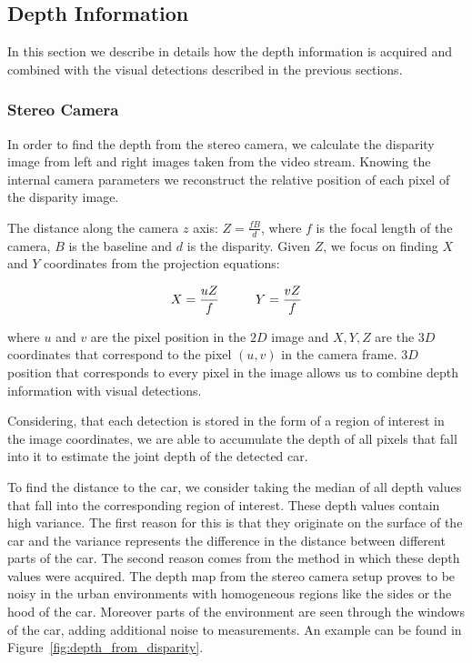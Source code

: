 \subsection{Depth Information}\label{sub:depth_information}

In this section we describe in details how the depth information is acquired
and combined with the visual detections described in the previous sections.

\subsubsection{Stereo Camera}\label{ssub:stereo_camera}

In order to find the depth from the stereo camera, we calculate the disparity
image from left and right images taken from the video stream. Knowing the
internal camera parameters we reconstruct the relative position of each pixel
of the disparity image.

The distance along the camera $z$ axis: $Z = \frac{fB}{d}$, where $f$ is the
focal length of the camera, $B$ is the baseline and $d$ is the disparity.
Given $Z$, we focus on finding $X$ and $Y$ coordinates from the projection
equations:

\begin{equation}
X = \frac{uZ}{f}
\hspace{10 mm}
Y = \frac{vZ}{f}
\end{equation}

where $u$ and $v$ are the pixel position in the $2D$ image and $X, Y, Z$ are
the $3D$ coordinates that correspond to the pixel $(u,v)$ in the camera frame.
$3D$ position that corresponds to every pixel in the image allows us to
combine depth information with visual detections.

Considering, that each detection is stored in the form of a region of interest
in the image coordinates, we are able to accumulate the depth of all pixels
that fall into it to estimate the joint depth of the detected car.

To find the distance to the car, we consider taking the median of all depth
values that fall into the corresponding region of interest. These depth values
contain high variance. The first reason for this is that they originate on the
surface of the car and the variance represents the difference in the distance
between different parts of the car. The second reason comes from the method in
which these depth values were acquired. The depth map from the stereo camera
setup proves to be noisy in the urban environments with homogeneous regions
like the sides or the hood of the car. Moreover parts of the environment are
seen through the windows of the car, adding additional noise to measurements.
An example can be found in Figure~\ref{fig:depth_from_disparity}.

